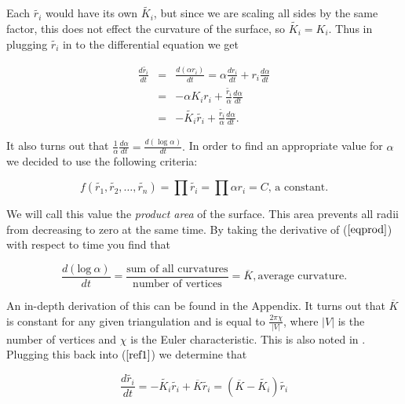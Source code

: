 \documentclass[12pt]{article}
\begin{document}
\noindent Each $\tilde{r_i}$ would have its own $\tilde{K_i}$, but since we are scaling all sides by the same factor, this does not effect the curvature of the surface, so $\tilde{K_i} = K_i$. Thus in plugging $\tilde{r_i}$ in to the differential equation we get
 
 \begin{eqnarray}
 \label{ref1}
 \frac{d\tilde{r_i}}{dt} &=& \frac{d(\alpha r_i)}{dt} = \alpha \frac{dr_i}{dt} + r_i\frac{d\alpha}{dt}\nonumber\\
 &=& -\alpha K_ir_i + \frac{\tilde{r_i}}{\alpha}\frac{d\alpha}{dt} \nonumber \\
 &=& -\tilde{K_i}\tilde{r_i} + \frac{\tilde{r_i}}{\alpha}\frac{d\alpha}{dt}.
 \end{eqnarray}
 
\noindent It also turns out that $\displaystyle \frac{1}{\alpha} \frac{d\alpha}{dt} = \frac{d(\log \alpha)}{dt}.$ 
 In order to find an appropriate value for $\alpha$ we decided to use the following criteria:
 
\begin{equation}
\label{eqprod}
f(\tilde{r_1},\tilde{r_2},\ldots,\tilde{r_n}) = \prod{\tilde{r_i}} = \prod{\alpha r_i} = C\mbox{, a constant.}
\end{equation}

\noindent We will call this value the \textit{product area} of the surface. This area prevents all radii from decreasing to zero at the same time. By taking the derivative of ($\ref{eqprod}$) with respect to time you find that 
 
\begin{equation}
\label{proof1}
\frac{d(\mbox{log}~\alpha)}{dt} = \frac{\mbox{sum of all curvatures}}{\mbox{number of vertices}} = \overline{K}, \mbox{average curvature.}
\end{equation}
 
\noindent An in-depth derivation of this can be found in the Appendix. It turns out that $\overline{K}$ is constant for any given triangulation and is equal to $\displaystyle\frac{2\pi\chi}{|V|}$, where $|V|$ is the number of vertices and $\chi$ is the Euler characteristic. This is also noted in \cite{chowluo}. Plugging this back into ($\ref{ref1}$) we determine that

\begin{equation}
\frac{d\tilde{r_i}}{dt} = -\tilde{K_i}\tilde{r_i} + \overline{K}\tilde{r_i} = (\overline{K} - \tilde{K_i})\tilde{r_i}
\end{equation}
\end{document}
